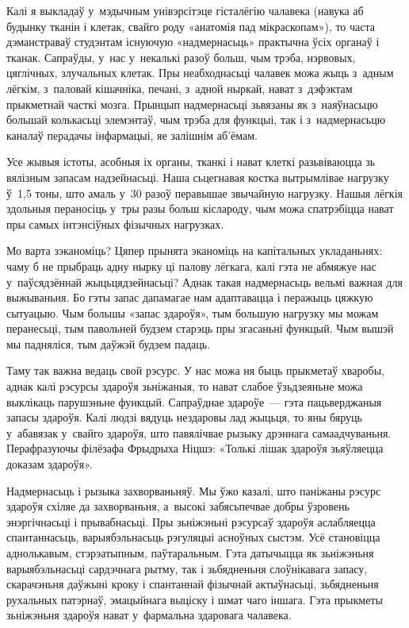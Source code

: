 Калі я выкладаў у~мэдычным унівэрсітэце гісталёгію чалавека (навука аб будынку тканін і клетак, свайго роду «анатомія пад мікраскопам»), то часта дэманстраваў студэнтам існуючую «надмернасьць» практычна ўсіх органаў і тканак. Сапраўды, у~нас у~некалькі разоў больш, чым трэба, нэрвовых, цяглічных, злучальных клетак. Пры неабходнасьці чалавек можа жыць з~адным лёгкім, з~паловай кішачніка, печані, з~адной ныркай, нават з~дэфэктам прыкметнай часткі мозга. Прынцып надмернасьці зьвязаны як з~наяўнасьцю большай колькасьці элемэнтаў, чым трэба для функцыі, так і з~надмернасьцю каналаў перадачы інфармацыі, яе залішнім аб'ёмам.

Усе жывыя істоты, асобныя іх органы, тканкі і нават клеткі разьвіваюцца зь вялізным запасам надзейнасьці. Наша сьцегнавая костка вытрымлівае нагрузку ў~1,5 тоны, што амаль у~30 разоў перавышае звычайную нагрузку. Нашыя лёгкія здольныя пераносіць у~тры разы больш кіслароду, чым можа спатрэбіцца нават пры самых інтэнсіўных фізычных нагрузках.

Мо варта зэканоміць? Цяпер прынята эканоміць на капітальных укладаньнях: чаму б не прыбраць адну нырку ці палову лёгкага, калі гэта не абмяжуе нас у~паўсядзённай жыцьцядзейнасьці? Аднак такая надмернасьць вельмі важная для выжываньня. Бо гэты запас дапамагае нам адаптавацца і перажыць цяжкую сытуацыю. Чым большы «запас здароўя», тым большую нагрузку мы можам перанесьці, тым павольней будзем старэць пры згасаньні функцый. Чым вышэй мы падняліся, тым даўжэй будзем падаць.

Таму так важна ведаць свой рэсурс. У нас можа ня быць прыкметаў хваробы, аднак калі рэсурсы здароўя зьніжаныя, то нават слабое ўзьдзеяньне можа выклікаць парушэньне функцый. Сапраўднае здароўе~--- гэта пацьверджаныя запасы здароўя. Калі людзі вядуць нездаровы лад жыцьця, то яны бяруць у~абавязак у~свайго здароўя, што павялічвае рызыку дрэннага самаадчуваньня. Перафразуючы філёзафа Фрыдрыха Ніцшэ: «Толькі лішак здароўя зьяўляецца доказам здароўя».

Надмернасьць і рызыка захворваньняў. Мы ўжо казалі, што паніжаны рэсурс здароўя схіляе да захворваньня, а~высокі забясьпечвае добры ўзровень энэргічнасьці і прывабнасьці. Пры зьніжэньні рэсурсаў здароўя аслабляецца спантаннасьць, варыябэльнасьць рэгуляцыі асноўных сыстэм. Усё становіцца аднолькавым, стэрэатыпным, паўтаральным. Гэта датычыцца як зьніжэньня варыябэльнасьці сардэчнага рытму, так і зьбядненьня слоўнікавага запасу, скарачэньня даўжыні кроку і спантаннай фізычнай актыўнасьці, зьбядненьня рухальных патэрнаў, эмацыйнага выціску і шмат чаго іншага. Гэта прыкметы зьніжэньня здароўя нават у~фармальна здаровага чалавека.

